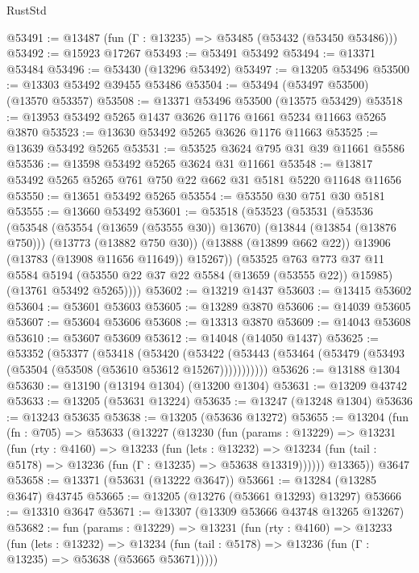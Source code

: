 \begin{lexlean}{RustStd}
\begin{coremodule}
@53491 := @13487 (fun (Γ : @13235) => @53485 (@53432 (@53450 @53486)))
@53492 := @15923 @17267
@53493 := @53491 @53492
@53494 := @13371 @53484
@53496 := @53430 (@13296 @53492)
@53497 := @13205 @53496
@53500 := @13303 @53492 @39455 @53486
@53504 := @53494 (@53497 @53500) (@13570 @53357)
@53508 := @13371 @53496 @53500 (@13575 @53429)
@53518 := @13953 @53492 @5265 @1437 @3626 @1176 @1661 @5234 @11663 @5265 @3870
@53523 := @13630 @53492 @5265 @3626 @1176 @11663
@53525 := @13639 @53492 @5265
@53531 := @53525 @3624 @795 @31 @39 @11661 @5586
@53536 := @13598 @53492 @5265 @3624 @31 @11661
@53548 := @13817 @53492 @5265 @5265 @761 @750 @22 @662 @31 @5181 @5220 @11648 @11656
@53550 := @13651 @53492 @5265
@53554 := @53550 @30 @751 @30 @5181
@53555 := @13660 @53492
@53601 := @53518
    (@53523
      (@53531
        (@53536
          (@53548
            (@53554 (@13659 (@53555 @30)) @13670)
            (@13844 (@13854 (@13876 @750)))
            (@13773 (@13882 @750 @30))
            (@13888 (@13899 @662 @22))
            @13906
            (@13783 (@13908 @11656 @11649))
            @15267))
        (@53525
          @763
          @773
          @37
          @11
          @5584
          @5194
          (@53550 @22 @37 @22 @5584 (@13659 (@53555 @22)) @15985)
          (@13761 @53492 @5265))))
@53602 := @13219 @1437
@53603 := @13415 @53602
@53604 := @53601 @53603
@53605 := @13289 @3870
@53606 := @14039 @53605
@53607 := @53604 @53606
@53608 := @13313 @3870
@53609 := @14043 @53608
@53610 := @53607 @53609
@53612 := @14048 (@14050 @1437)
@53625 := @53352
    (@53377
      (@53418
        (@53420
          (@53422 (@53443 (@53464 (@53479 (@53493 (@53504 (@53508 (@53610 @53612 @15267)))))))))))
@53626 := @13188 @1304
@53630 := @13190 (@13194 @1304) (@13200 @1304)
@53631 := @13209 @43742
@53633 := @13205 (@53631 @13224)
@53635 := @13247 (@13248 @1304)
@53636 := @13243 @53635
@53638 := @13205 (@53636 @13272)
@53655 := @13204
    (fun (fn : @705) =>
    @53633
      (@13227
        (@13230
          (fun (params : @13229) =>
          @13231
            (fun (rty : @4160) =>
            @13233
              (fun (lets : @13232) =>
              @13234 (fun (tail : @5178) => @13236 (fun (Γ : @13235) => @53638 @13319))))))
        @13365))
    @3647
@53658 := @13371 (@53631 (@13222 @3647))
@53661 := @13284 (@13285 @3647) @43745
@53665 := @13205 (@13276 (@53661 @13293) @13297)
@53666 := @13310 @3647
@53671 := @13307 (@13309 @53666 @43748 @13265 @13267)
@53682 := fun (params : @13229) =>
  @13231
    (fun (rty : @4160) =>
    @13233
      (fun (lets : @13232) =>
      @13234 (fun (tail : @5178) => @13236 (fun (Γ : @13235) => @53638 (@53665 @53671)))))

\end{coremodule}
\end{lexlean}

